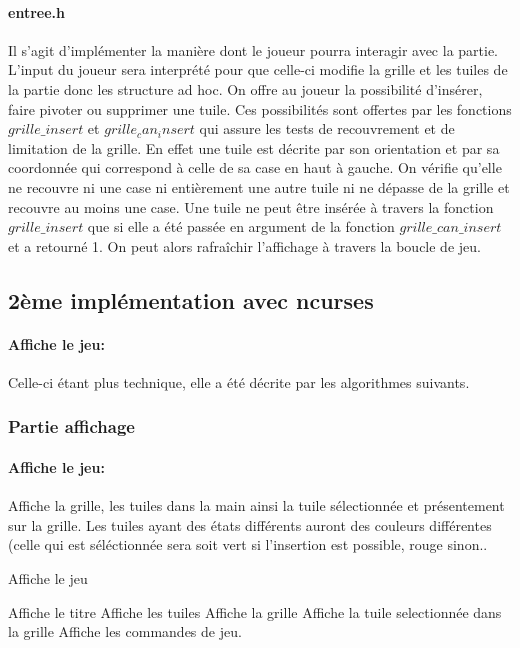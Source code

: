\documentclass[10pt]{article}
\begin{document}
       \paragraph{entree.h}
      Il s'agit d'implémenter la manière dont le joueur pourra interagir avec la partie. L'input du joueur sera interprété pour que celle-ci modifie
      la grille et les tuiles de la partie donc les structure ad hoc.
      On offre au joueur la possibilité d'insérer, faire pivoter ou supprimer une tuile. Ces possibilités sont offertes par les fonctions
      $grille\_insert$ et $grille_can_insert$
      qui assure les tests de recouvrement et de limitation de la grille.
      En effet une tuile est décrite par son orientation et par sa coordonnée qui correspond à celle de sa case en haut à gauche.
      On vérifie qu'elle ne recouvre ni une case ni entièrement une autre tuile ni ne dépasse de la grille et recouvre au moins une case.
      Une tuile ne peut être insérée à travers la fonction $grille\_insert$ que si elle a été passée en argument de la fonction $grille\_can\_insert$
      et a retourné 1.  On peut alors  rafraîchir l'affichage à travers la boucle de jeu.
  \subsection{2ème implémentation avec ncurses}
  \paragraph{Affiche le jeu:} Celle-ci étant plus technique, elle a été décrite par les algorithmes suivants.
  \subsubsection{Partie affichage}
  
  \paragraph{Affiche le jeu:} 
  Affiche la grille, les tuiles dans la main ainsi la tuile sélectionnée et présentement sur la grille.
  Les tuiles ayant des états différents auront des couleurs différentes
  (celle qui est séléctionnée sera soit vert si l'insertion est possible, rouge sinon..
  
  \begin{algorithm}
    \caption{Affiche le jeu}
    \begin{algorithmic}
      \STATE Affiche le titre
      \STATE Affiche les tuiles
      \STATE Affiche la grille
      \STATE Affiche la tuile selectionnée dans la grille
      \STATE Affiche les commandes de jeu.
    \end{algorithmic}
  \end{algorithm}	
\end{document}
